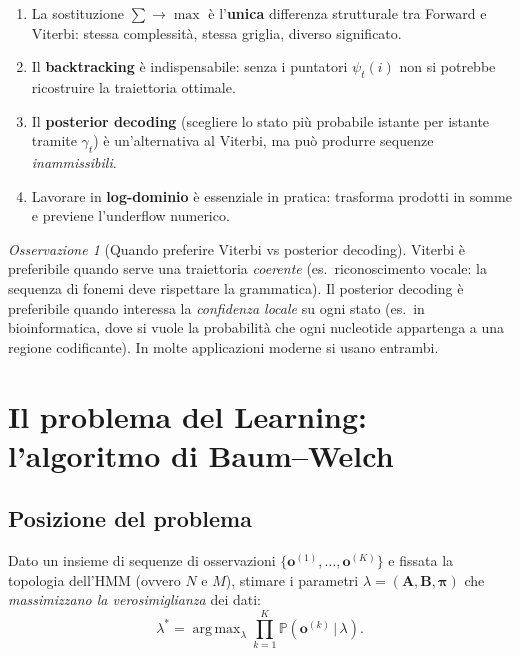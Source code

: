 \documentclass[11pt,a4paper,oneside]{book}
\theoremstyle{plain}
\theoremstyle{definition}
\theoremstyle{remark}
\newtheorem{osservazione}[teorema]{Osservazione}
\newcommand{\Prob}{\mathbb{P}}
\newcommand{\Amat}{\mathbf{A}}               %
\newcommand{\Bmat}{\mathbf{B}}               %
\newcommand{\initvec}{\boldsymbol{\pi}}      %
\newcommand{\hmm}{\lambda}                   %
\newcommand{\Nstates}{N}                     %
\newcommand{\Msym}{M}                        %
\newcommand{\seqobs}{\mathbf{o}}             %
\newcommand{\gam}{\gamma}                    %
\DeclareMathOperator*{\argmax}{arg\,max}
\newcommand{\given}{\,\vert\,}
\begin{document}
\begin{tcolorbox}[insightbox,title=Takeaway -- Capitolo 4]
\begin{enumerate}[leftmargin=*]
    \item La sostituzione $\sum \to \max$ è l'\textbf{unica}
          differenza strutturale tra Forward e Viterbi: stessa
          complessità, stessa griglia, diverso significato.
    \item Il \textbf{backtracking} è indispensabile: senza i
          puntatori $\psi_t(i)$ non si potrebbe ricostruire la
          traiettoria ottimale.
    \item Il \textbf{posterior decoding} (scegliere lo stato più
          probabile istante per istante tramite $\gam_t$) è
          un'alternativa al Viterbi, ma può produrre sequenze
          \emph{inammissibili}.
    \item Lavorare in \textbf{log-dominio} è essenziale in pratica:
          trasforma prodotti in somme e previene l'underflow
          numerico.
\end{enumerate}
\end{tcolorbox}

\begin{osservazione}[Quando preferire Viterbi vs posterior decoding]
Viterbi è preferibile quando serve una traiettoria \emph{coerente}
(es.\ riconoscimento vocale: la sequenza di fonemi deve rispettare
la grammatica). Il posterior decoding è preferibile quando interessa
la \emph{confidenza locale} su ogni stato (es.\ in bioinformatica,
dove si vuole la probabilità che ogni nucleotide appartenga a una
regione codificante). In molte applicazioni moderne si usano
entrambi.
\end{osservazione}

\chapter{Il problema del Learning: l'algoritmo di Baum--Welch}
\label{ch:baumwelch}

\section{Posizione del problema}

\begin{tcolorbox}[notebox,title=Problema 3 -- Learning]
Dato un insieme di sequenze di osservazioni $\{\seqobs^{(1)},\dots,
\seqobs^{(K)}\}$ e fissata la topologia dell'HMM (ovvero $\Nstates$ e
$\Msym$), stimare i parametri $\hmm = (\Amat,\Bmat,\initvec)$ che
\emph{massimizzano la verosimiglianza} dei dati:
\[
    \hmm^* = \argmax_{\hmm} \prod_{k=1}^{K} \Prob(\seqobs^{(k)}\given\hmm).
\]
\end{tcolorbox}
\end{document}
